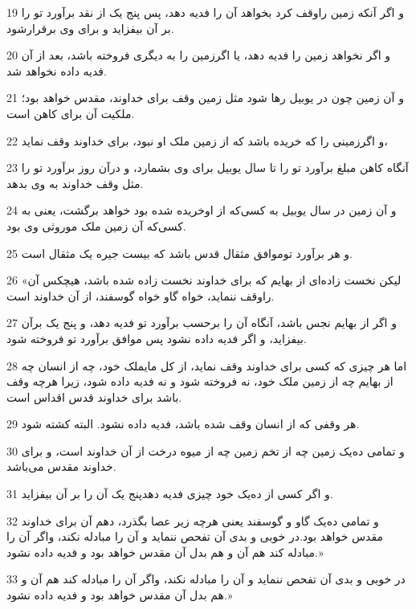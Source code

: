 \par 19 و اگر آنکه زمین راوقف کرد بخواهد آن را فدیه دهد، پس پنج یک از نقد برآورد تو را بر آن بیفزاید و برای وی برقرارشود.
\par 20 و اگر نخواهد زمین را فدیه دهد، یا اگرزمین را به دیگری فروخته باشد، بعد از آن فدیه داده نخواهد شد.
\par 21 و آن زمین چون در یوبیل رها شود مثل زمین وقف برای خداوند، مقدس خواهد بود؛ ملکیت آن برای کاهن است.
\par 22 و اگرزمینی را که خریده باشد که از زمین ملک او نبود، برای خداوند وقف نماید،
\par 23 آنگاه کاهن مبلغ برآورد تو را تا سال یوبیل برای وی بشمارد، و درآن روز برآورد تو را مثل وقف خداوند به وی بدهد.
\par 24 و آن زمین در سال یوبیل به کسی‌که از اوخریده شده بود خواهد برگشت، یعنی به کسی‌که آن زمین ملک موروثی وی بود.
\par 25 و هر برآورد توموافق مثقال قدس باشد که بیست جیره یک مثقال است.
\par 26 «لیکن نخست زاده‌ای از بهایم که برای خداوند نخست زاده شده باشد، هیچکس آن راوقف ننماید، خواه گاو خواه گوسفند، از آن خداوند است.
\par 27 و اگر از بهایم نجس باشد، آنگاه آن را برحسب برآورد تو فدیه دهد، و پنج یک برآن بیفزاید، و اگر فدیه داده نشود پس موافق برآورد تو فروخته شود.
\par 28 اما هر چیزی که کسی برای خداوند وقف نماید، از کل مایملک خود، چه از انسان چه از بهایم چه از زمین ملک خود، نه فروخته شود و نه فدیه داده شود، زیرا هر‌چه وقف باشد برای خداوند قدس اقداس است.
\par 29 هر وقفی که از انسان وقف شده باشد، فدیه داده نشود. البته کشته شود.
\par 30 و تمامی ده‌یک زمین چه از تخم زمین چه از میوه درخت از آن خداوند است، و برای خداوند مقدس می‌باشد.
\par 31 و اگر کسی از ده‌یک خود چیزی فدیه دهدپنج یک آن را بر آن بیفزاید.
\par 32 و تمامی ده‌یک گاو و گوسفند یعنی هر‌چه زیر عصا بگذرد، دهم آن برای خداوند مقدس خواهد بود.در خوبی و بدی آن تفحص ننماید و آن را مبادله نکند، واگر آن را مبادله کند هم آن و هم بدل آن مقدس خواهد بود و فدیه داده نشود.»
\par 33 در خوبی و بدی آن تفحص ننماید و آن را مبادله نکند، واگر آن را مبادله کند هم آن و هم بدل آن مقدس خواهد بود و فدیه داده نشود.»


